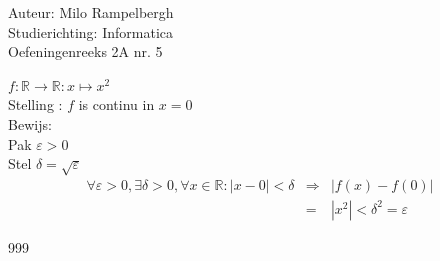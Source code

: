 \documentclass[a4paper]{article}
\begin{document}
\noindent \large Auteur: Milo Rampelbergh \\
\noindent \large Studierichting: Informatica\\
\noindent \large Oefeningenreeks 2A nr. 5\\

\medskip

\normalsize


$ f: \mathbb{R} \rightarrow \mathbb{R}: x \mapsto x^2 $ \\

Stelling : $ f $ is continu in $ x = 0 $ \\

Bewijs: \\

Pak $ \varepsilon > 0 $ \\

Stel $ \delta = \sqrt{\varepsilon} $ \\
\begin{eqnarray*}
\forall \varepsilon > 0, \exists \delta > 0, \forall x \in \mathbb{R}: |x-0| < \delta & \Rightarrow & |f(x) - f(0)| \\
& = & |x^2| < \delta^2 =  \varepsilon
\end{eqnarray*}


\begin{thebibliography}{999}
\end{thebibliography}
\end{document}
